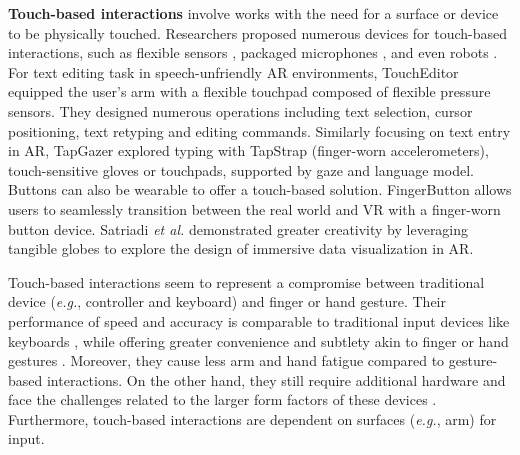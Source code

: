 \documentclass[review]{fcs}
\newcommand{\revise}[2]{\textcolor[rgb]{0,0,0}{#2}}
\begin{document}
\textbf{Touch-based interactions} involve works with the need for a surface or device to be physically touched. Researchers proposed numerous devices for touch-based interactions, such as flexible sensors \cite{DBLP:journals/imwut/ZhanXZGCGLQ23},  packaged microphones \cite{10522613}, and even robots \cite{DBLP:conf/vr/MortezapoorVVK23}.
\revise{For text editing task in speech-unfriendly AR environments, TouchEditor equipped the user's arm with a flexible touchpad composed of flexible pressure sensors \cite{DBLP:journals/imwut/ZhanXZGCGLQ23}.}{For text editing task in speech-unfriendly AR environments, TouchEditor \cite{DBLP:journals/imwut/ZhanXZGCGLQ23} equipped the user's arm with a flexible touchpad composed of flexible pressure sensors.} They designed numerous operations including text selection, cursor positioning, text retyping and editing commands. 
\revise{Similarly focusing on text entry in AR, TapGazer explored typing with TapStrap (finger-worn accelerometers), touch-sensitive gloves or touchpads, supported by gaze and language model \cite{DBLP:conf/chi/HeLP22}.}{Similarly focusing on text entry in AR, TapGazer \cite{DBLP:conf/chi/HeLP22} explored typing with TapStrap (finger-worn accelerometers), touch-sensitive gloves or touchpads, supported by gaze and language model.} Buttons can also be wearable to offer a touch-based solution.
\revise{FingerButton allows users to seamlessly transition between real world and VR with a finger-worn button device \cite{DBLP:conf/ismar/DasNH23}. Satriadi \textit{et al.} demonstrated greater creativity by leveraging tangible globes to explore the design of immersive data visualization in AR \cite{DBLP:conf/chi/SatriadiSECCLYD22}.}{FingerButton \cite{DBLP:conf/ismar/DasNH23} allows users to seamlessly transition between the real world and VR with a finger-worn button device. Satriadi \textit{et al.} \cite{DBLP:conf/chi/SatriadiSECCLYD22} demonstrated greater creativity by leveraging tangible globes to explore the design of immersive data visualization in AR.}

Touch-based interactions seem to represent a compromise between traditional device (\textit{e.g.}, controller and keyboard) and finger or hand gesture. Their performance of speed and accuracy is comparable to traditional input devices like keyboards \cite{DBLP:conf/chi/HeLP22}, while offering greater convenience and subtlety akin to finger or hand gestures \cite{DBLP:journals/imwut/ZhanXZGCGLQ23, DBLP:conf/ismar/DasNH23}. Moreover, they cause less arm and hand fatigue compared to gesture-based interactions. On the other hand, they still require additional hardware \cite{DBLP:conf/chi/HeLP22} and face the challenges related to the larger form factors of these devices \cite{DBLP:journals/imwut/ZhanXZGCGLQ23}. Furthermore, touch-based interactions are dependent on surfaces (\textit{e.g.}, arm) for input.
\end{document}
